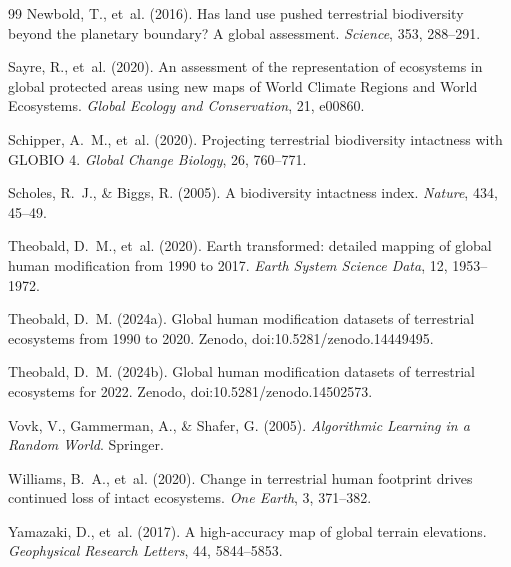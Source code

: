 \documentclass[11pt,a4paper]{article}
\begin{document}
\begin{thebibliography}{99}
Newbold, T., et~al. (2016). Has land use pushed terrestrial biodiversity beyond the planetary
boundary? A global assessment. \emph{Science}, 353, 288--291.

Sayre, R., et~al. (2020). An assessment of the representation of ecosystems in global protected
areas using new maps of World Climate Regions and World Ecosystems. \emph{Global Ecology and
Conservation}, 21, e00860.

Schipper, A.~M., et~al. (2020). Projecting terrestrial biodiversity intactness with GLOBIO 4.
\emph{Global Change Biology}, 26, 760--771.

Scholes, R.~J., \& Biggs, R. (2005). A biodiversity intactness index. \emph{Nature}, 434,
45--49.

Theobald, D.~M., et~al. (2020). Earth transformed: detailed mapping of global human
modification from 1990 to 2017. \emph{Earth System Science Data}, 12, 1953--1972.

Theobald, D.~M. (2024a). Global human modification datasets of terrestrial ecosystems from 1990
to 2020. Zenodo, doi:10.5281/zenodo.14449495.

Theobald, D.~M. (2024b). Global human modification datasets of terrestrial ecosystems for 2022.
Zenodo, doi:10.5281/zenodo.14502573.

Vovk, V., Gammerman, A., \& Shafer, G. (2005). \emph{Algorithmic Learning in a Random World}.
Springer.

Williams, B.~A., et~al. (2020). Change in terrestrial human footprint drives continued loss of
intact ecosystems. \emph{One Earth}, 3, 371--382.

Yamazaki, D., et~al. (2017). A high-accuracy map of global terrain elevations.
\emph{Geophysical Research Letters}, 44, 5844--5853.

\end{thebibliography}
\end{document}
